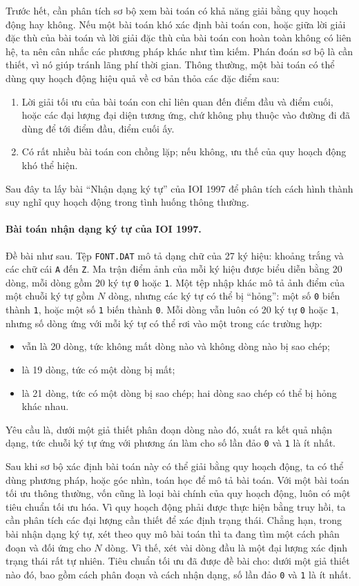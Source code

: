 \documentclass[11pt]{article}
\begin{document}
Trước hết, cần phân tích sơ bộ xem bài toán có khả năng giải bằng quy hoạch
động hay không. Nếu một bài toán khó xác định bài toán con, hoặc giữa lời giải
đặc thù của bài toán và lời giải đặc thù của bài toán con hoàn toàn không có
liên hệ, ta nên cân nhắc các phương pháp khác như tìm kiếm. Phán đoán sơ bộ là
cần thiết, vì nó giúp tránh lãng phí thời gian. Thông thường, một bài toán có
thể dùng quy hoạch động hiệu quả về cơ bản thỏa các đặc điểm sau:
\begin{enumerate}
  \item Lời giải tối ưu của bài toán con chỉ liên quan đến điểm đầu và điểm
  cuối, hoặc các đại lượng đại diện tương ứng, chứ không phụ thuộc vào đường
  đi đã dùng để tới điểm đầu, điểm cuối ấy.
  \item Có rất nhiều bài toán con chồng lặp; nếu không, ưu thế của quy hoạch
  động khó thể hiện.
\end{enumerate}

Sau đây ta lấy bài ``Nhận dạng ký tự'' của IOI 1997 để phân tích cách hình
thành suy nghĩ quy hoạch động trong tình huống thông thường.

\paragraph{Bài toán nhận dạng ký tự của IOI 1997.}
Đề bài như sau. Tệp \texttt{FONT.DAT} mô tả dạng chữ của 27 ký hiệu:
khoảng trắng và các chữ cái \texttt{A} đến \texttt{Z}. Ma trận điểm ảnh của
mỗi ký hiệu được biểu diễn bằng 20 dòng, mỗi dòng gồm 20 ký tự \texttt{0} hoặc
\texttt{1}. Một tệp nhập khác mô tả ảnh điểm của một chuỗi ký tự gồm \(N\)
dòng, nhưng các ký tự có thể bị ``hỏng'': một số \texttt{0} biến thành
\texttt{1}, hoặc một số \texttt{1} biến thành \texttt{0}. Mỗi dòng vẫn luôn
có 20 ký tự \texttt{0} hoặc \texttt{1}, nhưng số dòng ứng với mỗi ký tự có thể
rơi vào một trong các trường hợp:
\begin{itemize}
  \item vẫn là 20 dòng, tức không mất dòng nào và không dòng nào bị sao chép;
  \item là 19 dòng, tức có một dòng bị mất;
  \item là 21 dòng, tức có một dòng bị sao chép; hai dòng sao chép có thể bị
  hỏng khác nhau.
\end{itemize}
Yêu cầu là, dưới một giả thiết phân đoạn dòng nào đó, xuất ra kết quả nhận
dạng, tức chuỗi ký tự ứng với phương án làm cho số lần đảo \texttt{0} và
\texttt{1} là ít nhất.

Sau khi sơ bộ xác định bài toán này có thể giải bằng quy hoạch động, ta có thể
dùng phương pháp, hoặc góc nhìn, toán học để mô tả bài toán. Với một bài toán
tối ưu thông thường, vốn cũng là loại bài chính của quy hoạch động, luôn có
một tiêu chuẩn tối ưu hóa. Vì quy hoạch động phải được thực hiện bằng truy
hồi, ta cần phân tích các đại lượng cần thiết để xác định trạng thái. Chẳng
hạn, trong bài nhận dạng ký tự, xét theo quy mô bài toán thì ta đang tìm một
cách phân đoạn và đối ứng cho \(N\) dòng. Vì thế, xét vài dòng đầu là một đại
lượng xác định trạng thái rất tự nhiên. Tiêu chuẩn tối ưu đã được đề bài cho:
dưới một giả thiết nào đó, bao gồm cách phân đoạn và cách nhận dạng, số lần
đảo \texttt{0} và \texttt{1} là ít nhất.
\end{document}
